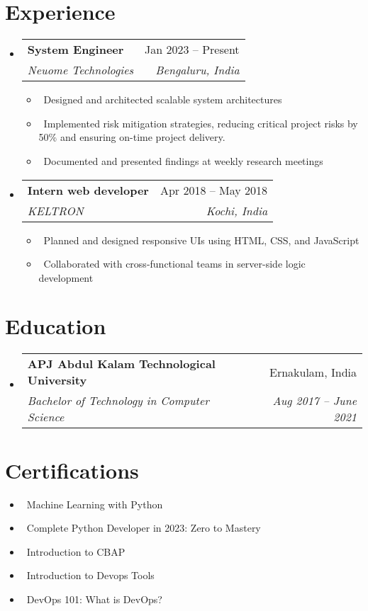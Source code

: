 \documentclass[letterpaper,10pt]{article}
\makeatletter
\newcommand{\resumeItem}[1]{\item\small{#1}}
\newcommand{\resumeSubheading}[4]{
\vspace{-1pt}\item
  \begin{tabular*}{0.97\textwidth}[t]{l@{\extracolsep{\fill}}r}
    \textbf{#1} & #2 \\
    \textit{#3} & \textit{#4} \\
  \end{tabular*}\vspace{-7pt}
}
\newcommand{\resumeSubHeadingList}{\begin{itemize}[leftmargin=0.15in, label={}]}
\newcommand{\resumeSubHeadingListEnd}{\end{itemize}}
\makeatother
\begin{document}
\section{Experience}
\resumeSubHeadingList
\resumeSubheading
{System Engineer}{Jan 2023 -- Present}
{Neuome Technologies}{Bengaluru, India}
\resumeSubHeadingList
\resumeItem{\textbullet\ 	Designed and architected scalable system architectures}
\resumeItem{\textbullet\	Implemented risk mitigation strategies, reducing critical project risks by 50\% and ensuring on-time project delivery.}
\resumeItem{\textbullet\ Documented and presented findings at weekly research meetings}
\resumeSubHeadingListEnd
\resumeSubheading
{Intern web developer}{Apr 2018 -- May 2018}
{KELTRON}{Kochi, India}
\resumeSubHeadingList
\resumeItem{\textbullet\ 	Planned and designed responsive UIs using HTML, CSS, and JavaScript}
\resumeItem{\textbullet\ Collaborated with cross-functional teams in server-side logic development}
\resumeSubHeadingListEnd
\resumeSubHeadingListEnd

\section{Education}
\resumeSubHeadingList
\resumeSubheading
{APJ Abdul Kalam Technological University}{Ernakulam, India}
{Bachelor of Technology in Computer Science}{Aug 2017 -- June 2021}
\resumeSubHeadingListEnd

\section{Certifications}
\resumeSubHeadingList
\resumeItem{\textbullet\ 	Machine Learning with Python}
\resumeItem{\textbullet\ 	Complete Python Developer in 2023: Zero to Mastery }
\resumeItem{\textbullet\  Introduction to CBAP}
\resumeItem{ \textbullet\ Introduction to Devops Tools}
\resumeItem{\textbullet\ DevOps 101: What is DevOps? }
\resumeSubHeadingListEnd
\end{document}
